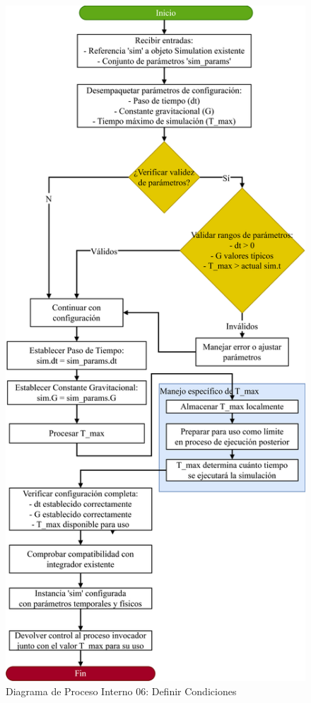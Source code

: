 \begin{figure}[H]
    \centering
    \includegraphics[width=\textwidth]{img/Analisis/DiagramaProcesos/DiagramaProceso06_DefinirCondiciones.png}
    \caption{Diagrama de Proceso Interno 06: Definir Condiciones}%
    \label{fig:process_diagram06}
\end{figure}


